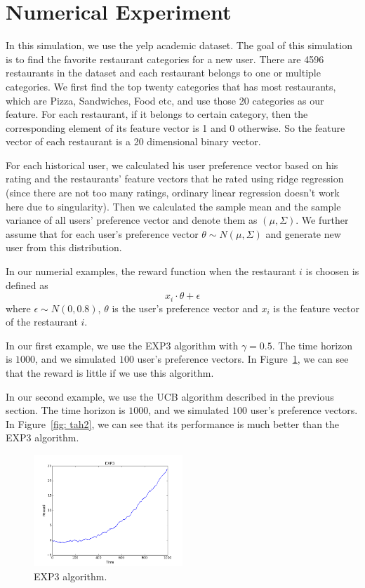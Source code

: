\documentclass{article}
\theoremstyle{plain}
\theoremstyle{definition}
\begin{document}
\section{Numerical Experiment}
In this simulation, we use the yelp academic dataset. The goal of this simulation is to find the favorite restaurant categories for a new user. There are 4596 restaurants in the dataset and each restaurant belongs to one or multiple categories. We first find the top twenty categories that has most restaurants, which are Pizza, Sandwiches, Food etc, and use those 20 categories as our feature. For each restaurant, if it belongs to certain category, then the corresponding element of its feature vector is 1 and 0 otherwise. So the feature vector of each restaurant is a 20 dimensional binary vector. 

For each historical user, we calculated his user preference vector based on his rating and the restaurants' feature vectors that he rated using ridge regression (since there are not too many ratings, ordinary linear regression doesn't work here due to singularity). Then we calculated the sample mean and the sample variance of all users' preference vector and denote them as $(\mu,\Sigma)$. We further assume that for each user's preference vector $\theta\sim N(\mu,\Sigma)$ and generate new user from this distribution.

In our numerial examples, the reward function when the restaurant
$i$ is choosen is defined as 
\[
x_{i}\cdot\theta+\epsilon
\]
where $\epsilon\sim N\left(0,0.8\right)$, $\theta$ is the user's
preference vector and $x_{i}$ is the feature vector of the restaurant
$i$.

In our first example, we use the EXP3 algorithm with $\gamma=0.5$.
The time horizon is $1000$, and we simulated $100$ user's preference
vectors. In Figure~\ref{fig: tahi}, we can see that the reward is little if we use this algorithm.

In our second example, we use the UCB algorithm described in the previous
section. The time horizon is $1000$, and we simulated $100$ user's
preference vectors.  In Figure~\ref{fig: tah2}, we can see that its performance is much better
than the EXP3 algorithm. 



\begin{figure}[htb]
{
\centering
\includegraphics[width=0.50\textwidth]{plot11}
\caption{EXP3 algorithm. \label{fig: tahi}}
}
\end{figure}
\end{document}

